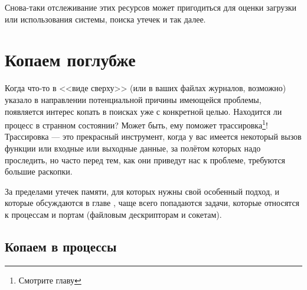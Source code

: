 Снова-таки отслеживание этих ресурсов может пригодиться для оценки загрузки или использования системы, поиска утечек и так далее.


\section{Копаем поглубже}
\label{sec:digging-in}

Когда что-то в <<виде сверху>> (или в ваших файлах журналов, возможно) указало в направлении потенциальной причины имеющейся проблемы, появляется интерес копать в поисках уже с конкретной целью. Находится ли процесс в странном состоянии? Может быть, ему поможет трассировка\footnote{Смотрите главу }! Трассировка --- это прекрасный инструмент, когда у вас имеется некоторый вызов функции или входные или выходные данные, за полётом которых надо проследить, но часто перед тем, как они приведут нас к проблеме, требуются большие раскопки.

За пределами утечек памяти, для которых нужны свой особенный подход, и которые обсуждаются в главе , чаще всего попадаются задачи, которые относятся к процессам и портам (файловым дескрипторам и сокетам).


\subsection{Копаем в процессы}
\label{subsec:digging-procs}

